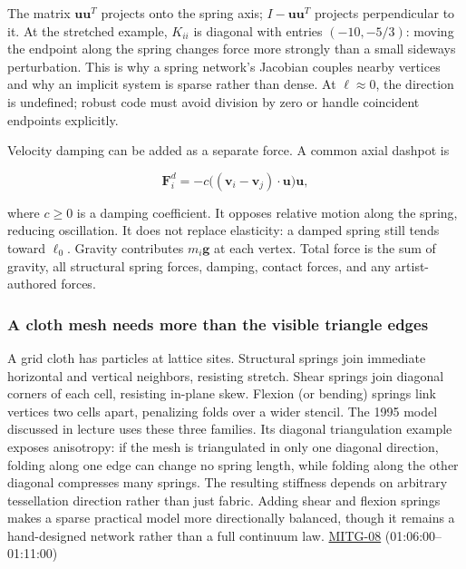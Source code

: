 The matrix \(\boldsymbol{u}\boldsymbol{u}^{T}\) projects onto the spring axis; \(I-\boldsymbol{u}\boldsymbol{u}^{T}\) projects perpendicular to it. At the stretched example, \(K_{ii}\) is diagonal with entries \((-10,-5/3)\): moving the endpoint along the spring changes force more strongly than a small sideways perturbation. This is why a spring network's Jacobian couples nearby vertices and why an implicit system is sparse rather than dense. At \(\ell\approx0\), the direction is undefined; robust code must avoid division by zero or handle coincident endpoints explicitly.

Velocity damping can be added as a separate force. A common axial dashpot is

\[
\boldsymbol{F}^{d}_i=-c\big((\boldsymbol{v}_i-\boldsymbol{v}_j)\cdot\boldsymbol{u}\big)\boldsymbol{u},
\]

where \(c\ge0\) is a damping coefficient. It opposes relative motion along the spring, reducing oscillation. It does not replace elasticity: a damped spring still tends toward \(\ell_0\). Gravity contributes \(m_i\boldsymbol{g}\) at each vertex. Total force is the sum of gravity, all structural spring forces, damping, contact forces, and any artist-authored forces.

\subsubsection{A cloth mesh needs more than the visible triangle edges}\label{a-cloth-mesh-needs-more-than-the-visible-triangle-edges}

A grid cloth has particles at lattice sites. Structural springs join immediate horizontal and vertical neighbors, resisting stretch. Shear springs join diagonal corners of each cell, resisting in-plane skew. Flexion (or bending) springs link vertices two cells apart, penalizing folds over a wider stencil. The 1995 model discussed in lecture uses these three families. Its diagonal triangulation example exposes anisotropy: if the mesh is triangulated in only one diagonal direction, folding along one edge can change no spring length, while folding along the other diagonal compresses many springs. The resulting stiffness depends on arbitrary tessellation direction rather than just fabric. Adding shear and flexion springs makes a sparse practical model more directionally balanced, though it remains a hand-designed network rather than a full continuum law. \hyperref[04-visual-computing-ii-ch036]{MITG-08} (01:06:00--01:11:00)

